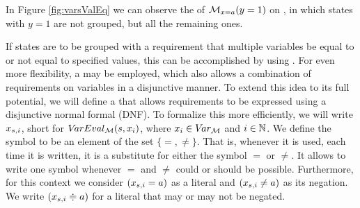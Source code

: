 \documentclass[preview]{standalone}
\begin{document}
\pagebreak

\begin{exmp}
	In Figure \ref{fig:varsValEq} we can observe the \viewN of $\viewparamvalueseq(y=1)$ on \chgph, in which states with $y=1$ are not grouped, but all the remaining ones.
\end{exmp}



If states are to be grouped with a requirement that multiple variables be equal to or not equal to specified values, this can be accomplished by using \parllcompN. For even more flexibility, a \viewN may be employed, which also allows a combination of requirements on variables in a disjunctive manner. To extend this idea to its full potential, we will define a \viewN that allows requirements to be expressed using a disjunctive normal formal (DNF). To formalize this \viewN more efficiently, we will write $\varstate[,i]$, short for $\vareval(\state, \var_i)$, where $x_i \in \vars$ and $i \in \natnums$. We define the symbol \eqorneq to be an element of the set $\{=,\neq\}$. That is, whenever it is used, each time it is written, it is a substitute for either the symbol $=$ or $\neq$. It allows to write one symbol whenever $=$ and $\neq$ could or should be possible. Furthermore, for this context we consider $(\varstate[,i] = \varval)$ as a literal and $(\varstate[,i] \neq \varval)$ as its negation. We write $(\varstate[,i] \eqorneq \varval)$ for a literal that may or may not be negated.
\end{document}
